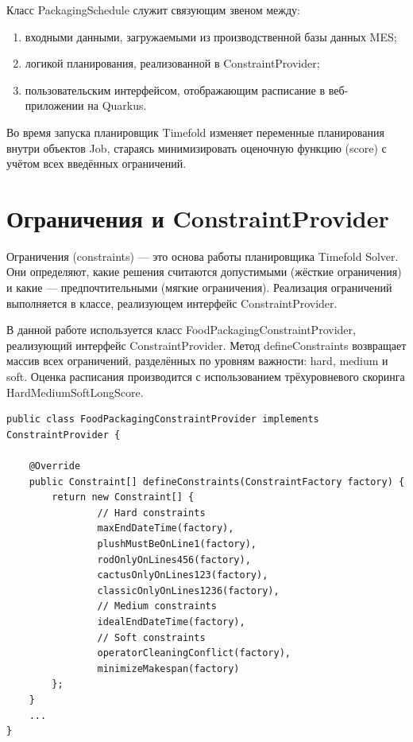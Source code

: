 Класс PackagingSchedule служит связующим звеном между:
\begin{enumerate}
    \item входными данными, загружаемыми из производственной базы данных MES;
    \item логикой планирования, реализованной в ConstraintProvider;
    \item пользовательским интерфейсом, отображающим расписание в веб-приложении на Quarkus.
\end{enumerate}

Во время запуска планировщик Timefold изменяет переменные планирования внутри объектов Job, стараясь минимизировать оценочную функцию (score) с учётом всех введённых ограничений.

\section{Ограничения и ConstraintProvider}

Ограничения (constraints) — это основа работы планировщика Timefold Solver. Они определяют, какие решения считаются допустимыми (жёсткие ограничения) и какие — предпочтительными (мягкие ограничения). Реализация ограничений выполняется в классе, реализующем интерфейс ConstraintProvider.

В данной работе используется класс FoodPackagingConstraintProvider, реализующий интерфейс ConstraintProvider. Метод defineConstraints возвращает массив всех ограничений, разделённых по уровням важности: hard, medium и soft. Оценка расписания производится с использованием трёхуровневого скоринга HardMediumSoftLongScore.

\begin{lstlisting}[caption={класс FoodPackagingConstraintProvider}, label={lst:classConstraintProvider}]
public class FoodPackagingConstraintProvider implements ConstraintProvider {

    @Override
    public Constraint[] defineConstraints(ConstraintFactory factory) {
        return new Constraint[] {
                // Hard constraints
                maxEndDateTime(factory),
                plushMustBeOnLine1(factory),
                rodOnlyOnLines456(factory),
                cactusOnlyOnLines123(factory),
                classicOnlyOnLines1236(factory),
                // Medium constraints
                idealEndDateTime(factory),
                // Soft constraints
                operatorCleaningConflict(factory),
                minimizeMakespan(factory)
        };
    }
    ...
}
\end{lstlisting}

